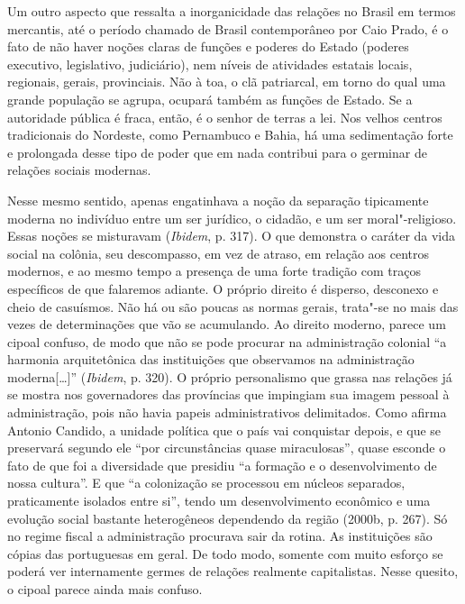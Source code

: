 Um outro aspecto que ressalta a inorganicidade das relações no Brasil em
termos mercantis, até o período chamado de Brasil contemporâneo por Caio
Prado, é o fato de não haver noções claras de funções e poderes do
Estado (poderes executivo, legislativo, judiciário), nem níveis de
atividades estatais locais, regionais, gerais, provinciais. Não à toa, o
clã patriarcal, em torno do qual uma grande população se agrupa, ocupará
também as funções de Estado. Se a autoridade pública é fraca, então, é o
senhor de terras a lei. Nos velhos centros tradicionais do Nordeste,
como Pernambuco e Bahia, há uma sedimentação forte e prolongada desse
tipo de poder que em nada contribui para o germinar de relações sociais
modernas.

Nesse mesmo sentido, apenas engatinhava a noção da separação tipicamente
moderna no indivíduo entre um ser jurídico, o cidadão, e um ser
moral"-religioso. Essas noções se misturavam (\emph{Ibidem}, p. 317). O
que demonstra o caráter da vida social na colônia, seu descompasso, em
vez de atraso, em relação aos centros modernos, e ao mesmo tempo a
presença de uma forte tradição com traços específicos de que falaremos
adiante. O próprio direito é disperso, desconexo e cheio de casuísmos.
Não há ou são poucas as normas gerais, trata"-se no mais das vezes de
determinações que vão se acumulando. Ao direito moderno, parece um
cipoal confuso, de modo que não se pode procurar na administração
colonial ``a harmonia arquitetônica das instituições que observamos na
administração moderna[\ldots{}]'' (\emph{Ibidem}, p. 320). O próprio
personalismo que grassa nas relações já se mostra nos governadores das
províncias que impingiam sua imagem pessoal à administração, pois não
havia papeis administrativos delimitados. Como afirma Antonio Candido, a
unidade política que o país vai conquistar depois, e que se preservará
segundo ele ``por circunstâncias quase miraculosas'', quase esconde o
fato de que foi a diversidade que presidiu ``a formação e o
desenvolvimento de nossa cultura''. E que ``a colonização se processou
em núcleos separados, praticamente isolados entre si'', tendo um
desenvolvimento econômico e uma evolução social bastante heterogêneos
dependendo da região (2000b, p. 267). Só no regime fiscal a
administração procurava sair da rotina. As instituições são cópias das
portuguesas em geral. De todo modo, somente com muito esforço se poderá ver
internamente germes de relações realmente capitalistas. Nesse quesito, o
cipoal parece ainda mais confuso.

